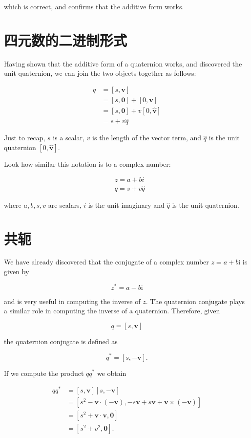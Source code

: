 which is correct, and confirms that the additive form works.

\section{四元数的二进制形式}
Having shown that the additive form of a quaternion works, and discovered the unit quaternion, we can join the two objects together as follows:

$$
\begin{aligned}
q & =[s, \mathbf{v}] \\
& =[s, \mathbf{0}]+[0, \mathbf{v}] \\
& =[s, \mathbf{0}]+v[0, \hat{\mathbf{v}}] \\
& =s+v \hat{q}
\end{aligned}
$$

Just to recap, $s$ is a scalar, $v$ is the length of the vector term, and $\hat{q}$ is the unit quaternion $[0, \hat{\mathbf{v}}]$.

Look how similar this notation is to a complex number:

$$
\begin{aligned}
& z=a+b i \\
& q=s+v \hat{q}
\end{aligned}
$$

where $a, b, s, v$ are scalars, $i$ is the unit imaginary and $\hat{q}$ is the unit quaternion.

\section{共轭}
We have already discovered that the conjugate of a complex number $z=a+b \mathrm{i}$ is given by

$$
z^{*}=a-b \mathrm{i}
$$

and is very useful in computing the inverse of $z$. The quaternion conjugate plays a similar role in computing the inverse of a quaternion. Therefore, given

$$
q=[s, \mathbf{v}]
$$

the quaternion conjugate is defined as

$$
q^{*}=[s,-\mathbf{v}] .
$$

If we compute the product $q q^{*}$ we obtain

$$
\begin{aligned}
q q^{*} & =[s, \mathbf{v}][s,-\mathbf{v}] \\
& =\left[s^{2}-\mathbf{v} \cdot(-\mathbf{v}),-s \mathbf{v}+s \mathbf{v}+\mathbf{v} \times(-\mathbf{v})\right] \\
& =\left[s^{2}+\mathbf{v} \cdot \mathbf{v}, \mathbf{0}\right] \\
& =\left[s^{2}+v^{2}, \mathbf{0}\right] .
\end{aligned}
$$

